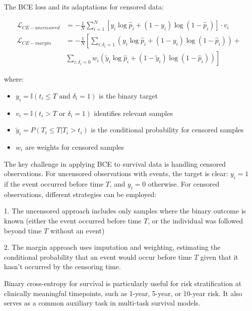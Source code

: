 \begin{definitionbox}[title=Binary Cross-Entropy for Survival]
  The BCE loss and its adaptations for censored data:

  \begin{align}
    \mathcal{L}_{CE-uncensored} &= -\frac{1}{N} \sum_{i=1}^N \left[ y_i \log \hat{p}_i + (1 - y_i) \log (1 - \hat{p}_i) \right] \cdot v_i \\
    \mathcal{L}_{CE-margin} &= -\frac{1}{N} \left[ \sum_{i:\delta_i = 1} \left( y_i \log \hat{p}_i + (1 - y_i) \log (1 - \hat{p}_i) \right) + \right. \\
      &\left. \sum_{i:\delta_i = 0} w_i \left( \tilde{y}_i \log \hat{p}_i + (1 - \tilde{y}_i) \log (1 - \hat{p}_i) \right) \right]
  \end{align}

  where:
  \begin{itemize}
  \item $y_i = \mathbb{I}(t_i \leq T \text{ and } \delta_i = 1)$ is the binary target
  \item $v_i = \mathbb{I}(t_i > T \text{ or } \delta_i = 1)$ identifies relevant samples
  \item $\tilde{y}_i = P(T_i \leq T | T_i > t_i)$ is the conditional probability for censored samples
  \item $w_i$ are weights for censored samples
  \end{itemize}
\end{definitionbox}

The key challenge in applying BCE to survival data is handling censored observations. For uncensored observations with events, the target is clear: $y_i = 1$ if the event occurred before time $T$, and $y_i = 0$ otherwise. For censored observations, different strategies can be employed:

1. The uncensored approach includes only samples where the binary outcome is known (either the event occurred before time $T$, or the individual was followed beyond time $T$ without an event)

2. The margin approach uses imputation and weighting, estimating the conditional probability that an event would occur before time $T$ given that it hasn't occurred by the censoring time.

Binary cross-entropy for survival is particularly useful for risk stratification at clinically meaningful timepoints, such as 1-year, 5-year, or 10-year risk. It also serves as a common auxiliary task in multi-task survival models.

